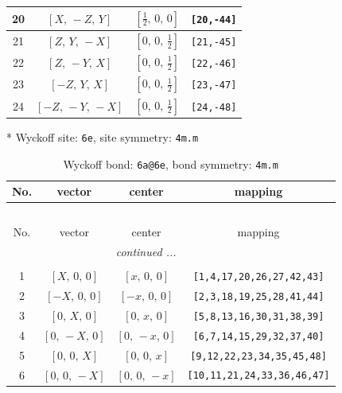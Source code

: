 \documentclass[fleqn,8pt]{jsarticle}
\begin{document}
\begin{longtable}{cccc}
20 & $\left[ X,\, - Z,\, Y \right]$ & $\left[ \frac{1}{2},\, 0,\, 0 \right]$ & {\tt [20,-44]} \\ \hline
21 & $\left[ Z,\, Y,\, - X \right]$ & $\left[ 0,\, 0,\, \frac{1}{2} \right]$ & {\tt [21,-45]} \\ \hline
22 & $\left[ Z,\, - Y,\, X \right]$ & $\left[ 0,\, 0,\, \frac{1}{2} \right]$ & {\tt [22,-46]} \\ \hline
23 & $\left[ - Z,\, Y,\, X \right]$ & $\left[ 0,\, 0,\, \frac{1}{2} \right]$ & {\tt [23,-47]} \\ \hline
24 & $\left[ - Z,\, - Y,\, - X \right]$ & $\left[ 0,\, 0,\, \frac{1}{2} \right]$ & {\tt [24,-48]} \\
\end{longtable}
* Wyckoff site: {\tt 6e}, site symmetry: {\tt 4m.m}
\renewcommand{\arraystretch}{1.2}
\begin{longtable}{cccc}
\caption{Wyckoff bond: {\tt 6a@6e}, bond symmetry: {\tt 4m.m}}
 \\
 \hline \hline
No. & vector & center & mapping \\ \hline \endfirsthead

\multicolumn{3}{l}{\tablename\ \thetable{}} \\
 \hline \hline
No. & vector & center & mapping \\ \hline \endhead

 \hline \hline
\multicolumn{3}{r}{\footnotesize\it continued ...} \\ \endfoot

 \hline \hline
\multicolumn{3}{r}{} \\ \endlastfoot

1 & $\left[ X,\, 0,\, 0 \right]$ & $\left[ x,\, 0,\, 0 \right]$ & {\tt [1,4,17,20,26,27,42,43]} \\ \hline
2 & $\left[ - X,\, 0,\, 0 \right]$ & $\left[ - x,\, 0,\, 0 \right]$ & {\tt [2,3,18,19,25,28,41,44]} \\ \hline
3 & $\left[ 0,\, X,\, 0 \right]$ & $\left[ 0,\, x,\, 0 \right]$ & {\tt [5,8,13,16,30,31,38,39]} \\ \hline
4 & $\left[ 0,\, - X,\, 0 \right]$ & $\left[ 0,\, - x,\, 0 \right]$ & {\tt [6,7,14,15,29,32,37,40]} \\ \hline
5 & $\left[ 0,\, 0,\, X \right]$ & $\left[ 0,\, 0,\, x \right]$ & {\tt [9,12,22,23,34,35,45,48]} \\ \hline
6 & $\left[ 0,\, 0,\, - X \right]$ & $\left[ 0,\, 0,\, - x \right]$ & {\tt [10,11,21,24,33,36,46,47]} \\
\end{longtable}
\end{document}
